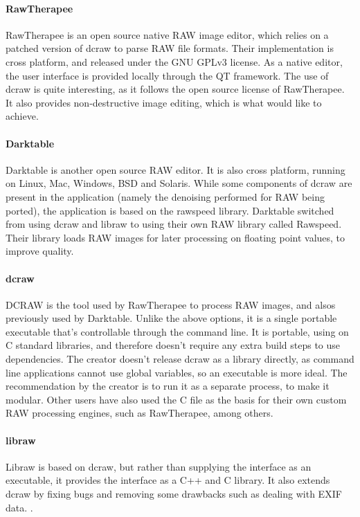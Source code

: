 \documentclass[10pt,a4paper]{article}
\begin{document}
    \paragraph{RawTherapee}
    RawTherapee is an open source native RAW image editor, which relies on a patched version of dcraw to parse RAW file formats.
    Their implementation is cross platform, and released under the GNU GPLv3 license. As a native editor, the user interface is provided
    locally through the QT framework. The use of dcraw is quite interesting, as it follows the open source license of RawTherapee. \cite{RawTherapeeReadme}
    It also provides non-destructive image editing, which is what  would like to achieve.
    \paragraph{Darktable}
    Darktable is another open source RAW editor. It is also cross platform, running on Linux, Mac, Windows, BSD and Solaris. While some components
    of dcraw are present in the application (namely the denoising performed for RAW being ported), the application is based on the rawspeed library.
    Darktable switched from using dcraw and libraw to using their own RAW library called Rawspeed. Their library loads RAW images for later
    processing on floating point values, to improve quality.  \cite{DarkTableAbout}

    \paragraph{dcraw}
    DCRAW is the tool used by RawTherapee to process RAW images, and alsos previously used by Darktable. Unlike the above options, it is a single portable
    executable that's controllable through the command line. It is portable, using on C standard libraries, and therefore doesn't require any extra build steps
    to use dependencies. The creator doesn't release dcraw as a library directly, as command line applications cannot use global variables, so an executable is
    more ideal. The recommendation by the creator is to run it as a separate process, to make it modular. Other users have also used the C file
    as the basis for their own custom RAW processing engines, such as RawTherapee, among others. \cite{DCRAWSource}

    \paragraph{libraw}
    Libraw is based on dcraw, but rather than supplying the interface as an executable, it provides the interface as a C++ and C library.
    It also extends dcraw by fixing bugs and removing some drawbacks such as dealing with EXIF data. \cite{LibrawSource}.
\end{document}
